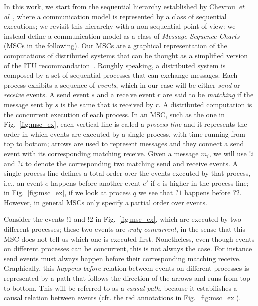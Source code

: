 In this work, we start from the sequential hierarchy established by Chevrou~\emph{et al}~\cite{DBLP:journals/fac/ChevrouHQ16}, where a 
communication model is represented by a class of sequential executions; we revisit this hierarchy 
with a non-sequential point of view: we instead define a communication model as a class of 
\emph{Message Sequence Charts} (MSCs in the following). 
Our MSCs are a graphical representation of the  computations of distributed systems that can be thought as a simplified
version of the ITU recommandation~\cite{messagesequencecharts}.  
Roughly speaking, a distributed system is composed by a set of 
sequential processes that can exchange messages. Each process exhibits a sequence of \emph{events}, which in our case will be either \emph{send} 
or \emph{receive} events. A send event $s$ and a receive event $r$ are said to be \emph{matching} if the message sent by $s$ is the same  that is 
received by $r$. A distributed computation is the concurrent execution of each process. In an MSC, such as the one in Fig.~\ref{fig:msc_ex}, each 
vertical line is called a \emph{process line} and it represents the order in which events are executed by a single process, with time running from 
top to bottom; arrows are used to represent messages and they connect a send event with its corresponding matching receive. 
Given a message $m_i$, we will use $!i$ and $?i$ to denote the corresponding two matching send and receive events. A single process line defines a 
total order over the events executed by that process, i.e., an event $e$ happens before another event $e'$ if $e$ is higher in the process line; 
in Fig.~\ref{fig:msc_ex}, if we look at process $q$ we see that $?1$ happens before $?2$. However, in general MSCs only specify a partial order 
over events. 

Consider the events $!1$ and $!2$ in Fig.~\ref{fig:msc_ex}, which are executed by two different processes; these two events are \emph{truly 
concurrent}, in the sense that this MSC does not tell us which one is executed first. 
Nonetheless, even though events on different processes can be concurrent, this is not always the case. For instance send events must always happen 
before their corresponding matching receive. Graphically, this \emph{happens before} relation between events on different processes is represented 
by a path that follows the direction of the arrows and runs from top to bottom. This will be referred to as a \emph{causal path}, because it 
estabilishes a causal relation between events (cfr. the red annotations in  Fig.~\ref{fig:msc_ex}). 


